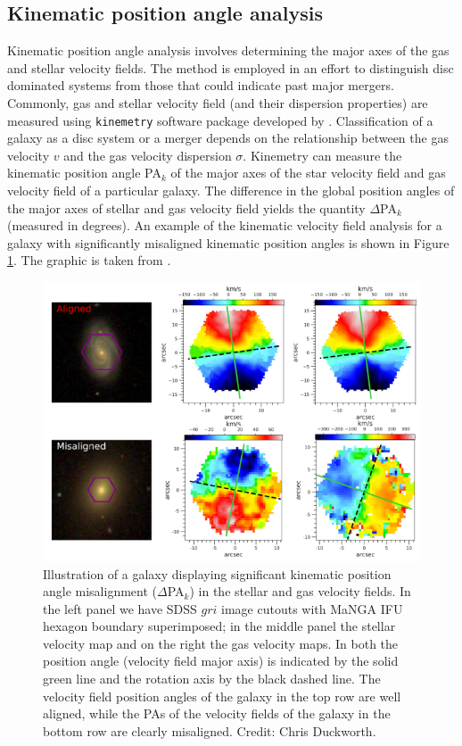 \subsection{Kinematic position angle analysis}
Kinematic position angle analysis involves determining the major axes of the gas and stellar velocity fields. The method is employed in an effort to distinguish disc dominated systems from those that could indicate past major mergers. Commonly, gas and stellar velocity field (and their dispersion properties) are measured using \texttt{kinemetry} software package developed by \citet{2006MNRAS.366..787K}. Classification of a galaxy as a disc system or a merger depends on the relationship between the gas velocity $v$ and the gas velocity dispersion $\sigma$. Kinemetry can measure the kinematic position angle PA$_{k}$ of the major axes of the star velocity field and gas velocity field of a particular galaxy. The difference in the global position angles of the major axes of stellar and gas velocity field yields the quantity $\Delta$PA$_{k}$ (measured in degrees). An example of the kinematic velocity field analysis for a galaxy with significantly misaligned kinematic position angles is shown in Figure \ref{fig:alligned-misaligned}. The graphic is taken from \citet{2019MNRAS.483..172D}.

\begin{figure}
    \centering
    \includegraphics[width=\textwidth]{images/PAplots/Aligned-Misalligned-DeltaPAs.png}
    \caption[Example of kinematic position angle misalignment]{Illustration of a galaxy displaying significant kinematic position angle misalignment ($\Delta$PA$_{k}$) in the stellar and gas velocity fields. In the left panel we have SDSS $gri$ image cutouts with MaNGA IFU hexagon boundary superimposed; in the middle panel the stellar velocity map and on the right the gas velocity maps. In both the position angle (velocity field major axis) is indicated by the solid green line and the rotation axis by the black dashed line. The velocity field position angles of the galaxy in the top row are well aligned, while the PAs of the velocity fields of the galaxy in the bottom row are clearly misaligned. Credit: Chris Duckworth.}
    \label{fig:alligned-misaligned}
\end{figure}


